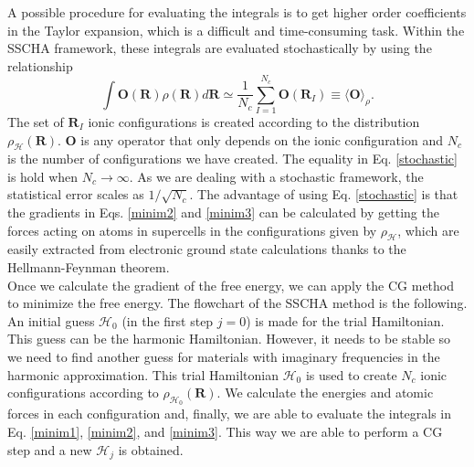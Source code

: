 A possible procedure for evaluating the integrals is to get higher order coefficients in the Taylor expansion, which is a difficult and time-consuming task. Within the SSCHA framework, these integrals are evaluated 
stochastically by using the relationship
\begin{equation}
 \label{stochastic}
 \int{\mathbf{O}(\mathbf{R})\rho(\mathbf{R})d\mathbf{R}}\simeq\frac{1}{N_{c}}\sum_{I=1}^{N_{c}}\mathbf{O}(\mathbf{R}_{I})\equiv\langle\mathbf{O}\rangle_{\rho}.
\end{equation}
The set of $\mathbf{R}_{I}$ ionic configurations is created according to the distribution $\rho_{\mathcal{H}}(\mathbf{R})$. $\mathbf{O}$ is any operator that only depends on the ionic configuration and $N_{c}$ is the number of 
configurations we have created. The equality in Eq. \ref{stochastic} is hold when $N_{c}\rightarrow\infty$. As we are dealing with a stochastic framework, the statistical error scales as $1/\sqrt{N_{c}}$. The advantage 
of using Eq. \ref{stochastic} is that the gradients in Eqs. \ref{minim2} and \ref{minim3} can be calculated by getting the forces acting on atoms in supercells in the configurations given by $\rho_{\mathcal{H}}$, which are easily 
extracted from electronic ground state calculations thanks to the Hellmann-Feynman theorem. \\

Once we calculate the gradient of the free energy, we can apply the CG method to minimize the free energy. The flowchart of the SSCHA method is the following. An initial guess $\mathcal{H}_{0}$ (in the first 
step $j=0$) is made for the trial Hamiltonian. This guess can be the harmonic Hamiltonian. However, it needs to be stable so we need to find another guess for materials with imaginary frequencies in the harmonic approximation. This 
trial Hamiltonian $\mathcal{H}_{0}$ is used to create $N_{c}$ ionic configurations according to $\rho_{\mathcal{H}_{0}}(\mathbf{R})$. We calculate the energies and atomic forces in each configuration and, finally, we are able to 
evaluate the integrals in Eq. \ref{minim1}, \ref{minim2}, and \ref{minim3}. This way we are able to perform a CG step and a new $\mathcal{H}_{j}$ is obtained. \\

